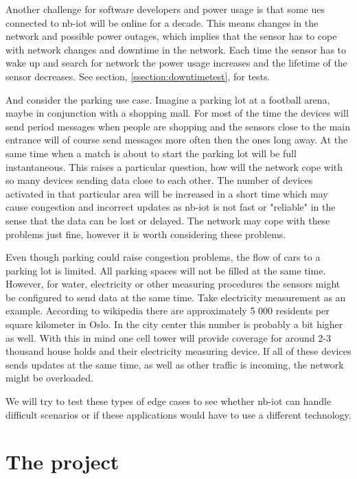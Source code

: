 \documentclass[USenglish]{ifimaster}  %
\begin{document}
Another challenge for software developers and power usage is that some \acrshort{ue}s connected to \acrshort{nb-iot} will be online for a decade. This means changes in the network and possible power outages, which implies that the sensor has to cope with network changes and downtime in the network. Each time the sensor has to wake up and search for network the power usage increases and the lifetime of the sensor decreases. See section, \vref{ssection:downtimetest}, for tests.

And consider the parking use case. Imagine a parking lot at a football arena, maybe in conjunction with a shopping mall. For most of the time the devices will send period messages when people are shopping and the sensors close to the main entrance will of course send messages more often then the ones long away. At the same time when a match is about to start the parking lot will be full instantaneous. This raises a particular question, how will the network cope with so many devices sending data close to each other. The number of devices activated in that particular area will be increased in a short time which may cause congestion and incorrect updates as \acrshort{nb-iot} is not fast or "reliable" in the sense that the data can be lost or delayed. The network may cope with these problems just fine, however it is worth considering these problems.


Even though parking could raise congestion problems, the flow of cars to a parking lot is limited. All parking spaces will not be filled at the same time. However, for water, electricity or other measuring procedures the sensors might be configured to send data at the same time. Take electricity measurement as an example. According to wikipedia \cite{online:avgpeople} there are approximately 5 000 residents per square kilometer in Oslo. In the city center this number is probably a bit higher as well. With this in mind one cell tower will provide coverage for around 2-3 thousand house holds and their electricity measuring device. If all of these devices sends updates at the same time, as well as other traffic is incoming, the network might be overloaded.

We will try to test these types of edge cases to see whether \acrshort{nb-iot} can handle difficult scenarios or if these applications would have to use a different technology.

\part{The project}                    %
\end{document}
